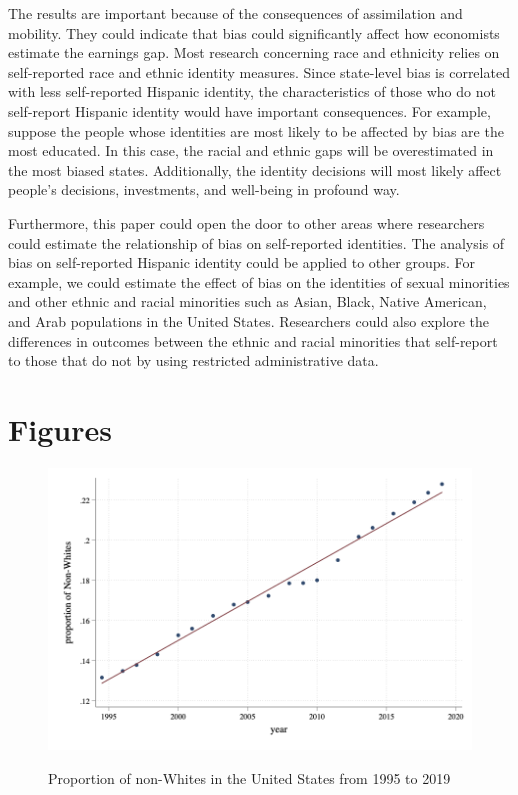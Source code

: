 \documentclass[12pt, fullpage]{article}
\begin{document}
The results are important because of the consequences of assimilation and mobility. They could indicate that bias could significantly affect how economists estimate the earnings gap. Most research concerning race and ethnicity relies on self-reported race and ethnic identity measures. Since state-level bias is correlated with less self-reported Hispanic identity, the characteristics of those who do not self-report Hispanic identity would have important consequences. For example, suppose the people whose identities are most likely to be affected by bias are the most educated. In this case, the racial and ethnic gaps will be overestimated in the most biased states. Additionally, the identity decisions will most likely affect people's decisions, investments, and well-being in profound way. 

Furthermore, this paper could open the door to other areas where researchers could estimate the relationship of bias on self-reported identities. The analysis of bias on self-reported Hispanic identity could be applied to other groups. For example, we could estimate the effect of bias on the identities of sexual minorities and other ethnic and racial minorities such as Asian, Black, Native American, and Arab populations in the United States. Researchers could also explore the differences in outcomes between the ethnic and racial minorities that self-report to those that do not by using restricted administrative data. 

\pagebreak
\newpage

\appendix

\pagebreak
\newpage

\section{Figures}

\begin{figure}[H]
\begin{center}
\caption{Proportion of non-Whites in the United States from 1995 to 2019}
\includegraphics[width=\textwidth]{GraphNonWhites.png} 
\label{fig:1}
\end{center}
\end{figure}
\end{document}
